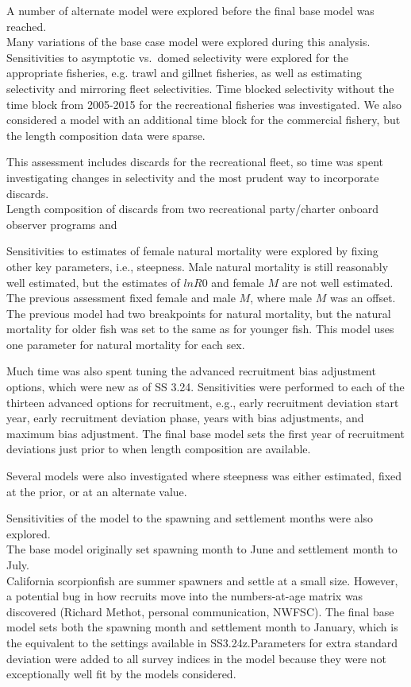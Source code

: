 \documentclass[12pt,]{article}
\begin{document}
A number of alternate model were explored before the final base model
was reached.\\
Many variations of the base case model were explored during this
analysis. Sensitivities to asymptotic vs.~domed selectivity were
explored for the appropriate fisheries, e.g. trawl and gillnet
fisheries, as well as estimating selectivity and mirroring fleet
selectivities. Time blocked selectivity without the time block from
2005-2015 for the recreational fisheries was investigated. We also
considered a model with an additional time block for the commercial
fishery, but the length composition data were sparse.

This assessment includes discards for the recreational fleet, so time
was spent investigating changes in selectivity and the most prudent way
to incorporate discards.\\
Length composition of discards from two recreational party/charter
onboard observer programs and

Sensitivities to estimates of female natural mortality were explored by
fixing other key parameters, i.e., steepness. Male natural mortality is
still reasonably well estimated, but the estimates of \(lnR0\) and
female \(M\) are not well estimated. The previous assessment fixed
female and male \(M\), where male \(M\) was an offset. The previous
model had two breakpoints for natural mortality, but the natural
mortality for older fish was set to the same as for younger fish. This
model uses one parameter for natural mortality for each sex.

Much time was also spent tuning the advanced recruitment bias adjustment
options, which were new as of SS 3.24. Sensitivities were performed to
each of the thirteen advanced options for recruitment, e.g., early
recruitment deviation start year, early recruitment deviation phase,
years with bias adjustments, and maximum bias adjustment. The final base
model sets the first year of recruitment deviations just prior to when
length composition are available.

Several models were also investigated where steepness was either
estimated, fixed at the prior, or at an alternate value.

Sensitivities of the model to the spawning and settlement months were
also explored.\\
The base model originally set spawning month to June and settlement
month to July.\\
California scorpionfish are summer spawners and settle at a small size.
However, a potential bug in how recruits move into the numbers-at-age
matrix was discovered (Richard Methot, personal communication, NWFSC).
The final base model sets both the spawning month and settlement month
to January, which is the equivalent to the settings available in
SS3.24z.Parameters for extra standard deviation were added to all survey
indices in the model because they were not exceptionally well fit by the
models considered.
\end{document}
